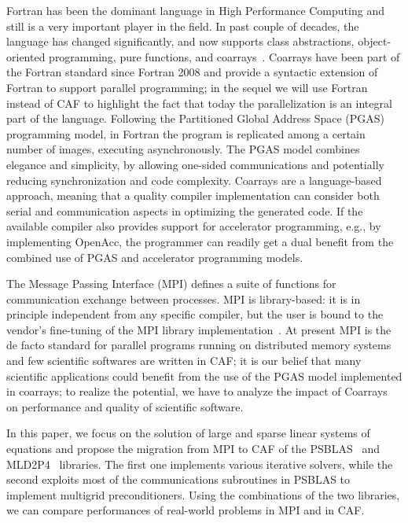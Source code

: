 \documentclass{IOS-Book-Article}
\begin{document}
Fortran has been the dominant language in High Performance
Computing and still is a very important player in the field. In past
couple of decades, the language has changed significantly,  and now 
supports class abstractions, object-oriented programming, pure
functions, and coarrays~\cite{Metcalf:2011:MFE}.  
Coarrays have been part of the Fortran standard since
Fortran 2008 and provide a syntactic extension of Fortran to
support parallel programming; in the sequel we will use Fortran
instead of CAF to highlight the fact that today the parallelization is
an integral part of the language.
Following the  Partitioned Global Address Space (PGAS) programming model,
in Fortran the program is replicated among a certain number of images,
executing asynchronously. 
The PGAS model combines elegance and simplicity, by allowing one-sided
communications and potentially reducing synchronization and code 
complexity. 
Coarrays are  a language-based approach, meaning that a quality
compiler implementation can consider both serial and communication
aspects in optimizing the generated code.
If the available  compiler also provides support for accelerator
programming, e.g., by implementing OpenAcc, the programmer can readily
get a dual benefit from the combined use of PGAS and accelerator
programming models. 

The Message Passing Interface (MPI) defines a suite of functions for
communication exchange between processes. MPI  is
library-based:  it is in principle independent from any specific
compiler, but the user  is bound to the vendor's fine-tuning of the
MPI library implementation~\cite{Garain:2015}.
%
At present  MPI is the de facto standard for parallel programs running
on distributed memory systems and few scientific softwares are written in
CAF; it is our belief that many scientific applications could
benefit from the use of the PGAS model implemented in coarrays; to
realize the potential, we have to analyze the impact of 
Coarrays  on performance and quality of scientific software.

In this paper, we focus on the solution of large and sparse linear
systems of equations and propose the migration from MPI to CAF of the
PSBLAS~\cite{PSBLAS} and MLD2P4~\cite{mld-toms} libraries.
%
The first one implements various iterative solvers, while the second
exploits most of the communications subroutines in PSBLAS to implement
multigrid preconditioners. Using the combinations of the two
libraries, we can compare performances of real-world problems in MPI
and in CAF.
\end{document}
